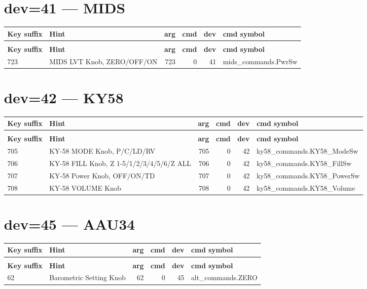 \documentclass[10pt,a4paper]{article}
\begin{document}
\section{dev=41 — MIDS}
\begin{longtable}{>{\ttfamily\small}p{38mm} >{\small}p{72mm} r r r >{\ttfamily\small}p{48mm}}
\toprule
\textbf{Key suffix} & \textbf{Hint} & \textbf{arg} & \textbf{cmd} & \textbf{dev} & \textbf{cmd symbol} \\
\midrule
\endfirsthead
\multicolumn{6}{l}{\small\itshape continued\ldots}\\
\toprule
\textbf{Key suffix} & \textbf{Hint} & \textbf{arg} & \textbf{cmd} & \textbf{dev} & \textbf{cmd symbol} \\
\midrule
\endhead
\bottomrule
\endfoot
\rowcolor{rowodd}
  723 & MIDS LVT Knob, ZERO/OFF/ON & 723 & 0 & 41 & mids\_commands.PwrSw \\
\end{longtable}
\section{dev=42 — KY58}
\begin{longtable}{>{\ttfamily\small}p{38mm} >{\small}p{72mm} r r r >{\ttfamily\small}p{48mm}}
\toprule
\textbf{Key suffix} & \textbf{Hint} & \textbf{arg} & \textbf{cmd} & \textbf{dev} & \textbf{cmd symbol} \\
\midrule
\endfirsthead
\multicolumn{6}{l}{\small\itshape continued\ldots}\\
\toprule
\textbf{Key suffix} & \textbf{Hint} & \textbf{arg} & \textbf{cmd} & \textbf{dev} & \textbf{cmd symbol} \\
\midrule
\endhead
\bottomrule
\endfoot
\rowcolor{rowodd}
  705 & KY-58 MODE Knob, P/C/LD/RV & 705 & 0 & 42 & ky58\_commands.KY58\_ModeSw \\
  706 & KY-58 FILL Knob, Z 1-5/1/2/3/4/5/6/Z ALL & 706 & 0 & 42 & ky58\_commands.KY58\_FillSw \\
\rowcolor{rowodd}
  707 & KY-58 Power Knob, OFF/ON/TD & 707 & 0 & 42 & ky58\_commands.KY58\_PowerSw \\
  708 & KY-58 VOLUME Knob & 708 & 0 & 42 & ky58\_commands.KY58\_Volume \\
\end{longtable}
\section{dev=45 — AAU34}
\begin{longtable}{>{\ttfamily\small}p{38mm} >{\small}p{72mm} r r r >{\ttfamily\small}p{48mm}}
\toprule
\textbf{Key suffix} & \textbf{Hint} & \textbf{arg} & \textbf{cmd} & \textbf{dev} & \textbf{cmd symbol} \\
\midrule
\endfirsthead
\multicolumn{6}{l}{\small\itshape continued\ldots}\\
\toprule
\textbf{Key suffix} & \textbf{Hint} & \textbf{arg} & \textbf{cmd} & \textbf{dev} & \textbf{cmd symbol} \\
\midrule
\endhead
\bottomrule
\endfoot
\rowcolor{rowodd}
  62 & Barometric Setting Knob & 62 & 0 & 45 & alt\_commands.ZERO \\
\end{longtable}
\end{document}
